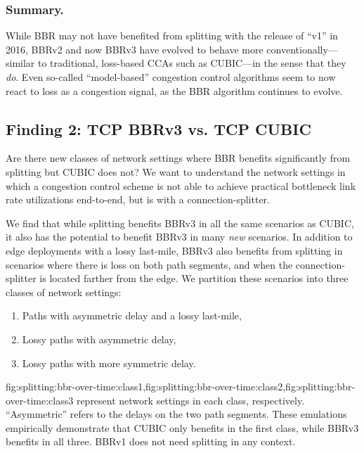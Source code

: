 \subsubsection{Summary.}

While BBR may not have benefited from splitting with the release of ``v1'' in 2016, BBRv2 and
now BBRv3 have evolved to behave more conventionally---similar to traditional,
loss-based CCAs such as CUBIC---in the sense that they \textit{do}. Even
so-called ``model-based'' congestion control algorithms seem to now react to
loss as a congestion signal, as the BBR algorithm continues to evolve.

\subsection{Finding 2: TCP BBRv3 vs. TCP CUBIC}
\label{sec:splitting:results:finding2}


Are there new classes of network settings where BBR benefits significantly from
splitting but CUBIC does not? We want to understand the network settings in
which a congestion control scheme is not able to achieve practical bottleneck
link rate utilizations end-to-end, but is with a connection-splitter.

We find that while splitting benefits BBRv3 in all the same scenarios as CUBIC,
it also has the potential to benefit BBRv3 in many \textit{new} scenarios.
In addition to edge deployments with a lossy last-mile, BBRv3
also benefits from splitting in scenarios where there is loss on both path
segments, and when the connection-splitter is located farther from the edge.
We partition these scenarios into three classes of network settings:

\begin{enumerate}[label=\Roman*.,noitemsep]
\item Paths with asymmetric delay and a lossy last-mile,
\item Lossy paths with asymmetric delay,
\item Lossy paths with more symmetric delay.
\end{enumerate}

\noindent \Cref
 {fig:splitting:bbr-over-time:class1,fig:splitting:bbr-over-time:class2,fig:splitting:bbr-over-time:class3}
represent network settings in each class, respectively.
``Asymmetric'' refers to the delays on the two path segments.
These emulations empirically demonstrate that CUBIC only benefits in the first
class, while BBRv3 benefits in all three.
BBRv1 does not need splitting in any context.

